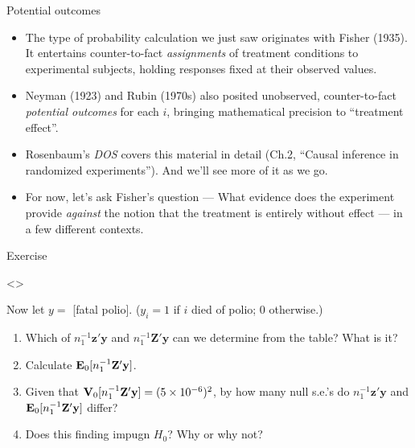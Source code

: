 \begin{frame}{Potential outcomes}
  
  \begin{itemize}[<+->]
  \item The type of probability calculation we just saw originates
    with Fisher (1935). It entertains counter-to-fact
    \textit{assignments} of treatment conditions to experimental
    subjects, holding responses fixed at their observed values.
  \item Neyman (1923) and Rubin (1970s) also posited
    unobserved, counter-to-fact \textit{potential outcomes} for each
    $i$, bringing mathematical precision to ``treatment effect''.
   \item Rosenbaum's \textit{DOS} covers this material in detail
       (Ch.2, ``Causal inference in randomized experiments''). And we'll
       see more of it as we go.
   \item For now, let's ask Fisher's question --- What evidence does
     the experiment provide \textit{against} the notion that the
     treatment is entirely without effect --- in a few different contexts.
  \end{itemize}

\end{frame}

\begin{frame}{Exercise}

\only<\nottheirhandout>{
Now let $y=$ [fatal polio].  ($y_{i}=1$ if $i$ died of polio; 0 otherwise.)  
  \begin{enumerate}
  \item Which of
    $n_{1}^{-1}\mathbf{z}'\mathbf{y}$ and
    $n_{1}^{-1}\mathbf{Z}'\mathbf{y}$ can we determine
    from the table? What is it? 
  \item Calculate $\mathbf{E}_{0}[n_{1}^{-1}\mathbf{Z}'\mathbf{y}]$.
  \item Given that $\mathbf{V}_{0}[n_{1}^{-1}\mathbf{Z}'\mathbf{y}]=(5
    \times 10^{-6})^{2}$, by
    how many null s.e.'s do $n_{1}^{-1}\mathbf{z}'\mathbf{y}$ and $\mathbf{E}_{0}[n_{1}^{-1}\mathbf{Z}'\mathbf{y}]$ differ?
    \item Does this finding impugn $H_{0}$?  Why or why not?
  \end{enumerate}
}
  
\end{frame}


